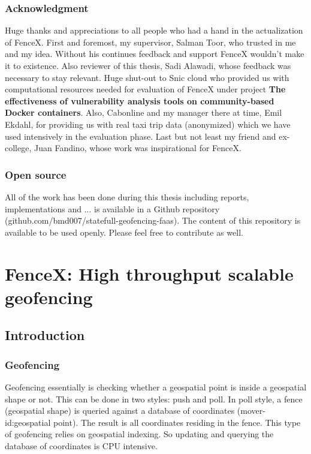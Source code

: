 \documentclass[a4]{report}
\begin{document}
    \section{Acknowledgment}
    Huge thanks and appreciations to all people who had a hand in the actualization of FenceX.
    First and foremost, my supervisor, Salman Toor, who trusted in me and my idea.
    Without his continues feedback and support FenceX wouldn't make it to existence.
    Also reviewer of this thesis, Sadi Alawadi, whose feedback was necessary to stay relevant.
    Huge shut-out to Snic cloud who provided us with computational resources needed for evaluation of FenceX under
    project \textbf{The effectiveness of vulnerability analysis tools on community-based Docker containers}.
    Also, Cabonline and my manager there at time,  Emil Ekdahl, for providing us with real taxi trip data
    (anonymized) which we have used intensively in the evaluation phase.
    Last but not least my friend and ex-college, Juan Fandino, whose work was inspirational for FenceX.


    \section{Open source}
    All of the work has been done during this thesis including reports, implementations and ... is available in
    a Github repository (github.com/bmd007/statefull-geofencing-faas).
    The content of this repository is available to be used openly.
    Please feel free to contribute as well.

    \part[FenceX]{FenceX: High throughput scalable geofencing}


    \chapter{Introduction}


    \section{Geofencing}
    Geofencing essentially is checking whether a geospatial point is inside a geospatial shape or not.
    This can be done in two styles: push and poll.
    In poll style, a fence (geospatial shape) is queried against a database of coordinates (mover-id:geospatial point).
    The result is all coordinates residing in the fence.
    This type of geofencing relies on geospatial indexing.
    So updating and querying the database of coordinates is CPU intensive.
\end{document}
